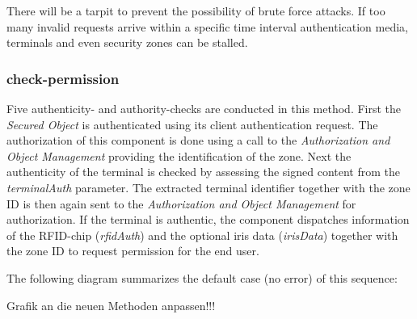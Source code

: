 \documentclass[12pt,a4paper,titlepage,oneside]{scrartcl}
\begin{document}
There will be a tarpit to prevent the possibility of brute force attacks. If too many invalid requests arrive within a specific time interval  authentication media, terminals and even security zones can be stalled.

\subsubsection{check-permission}

Five authenticity- and authority-checks are conducted in this method. First the \emph{Secured Object} is authenticated using its client authentication request. The authorization of this component is done using a call to the \emph{Authorization and Object Management} providing the identification of the zone. Next the authenticity of the terminal is checked by assessing the signed content from the \emph{terminalAuth} parameter. The extracted terminal identifier together with the zone ID is then again sent to the \emph{Authorization and Object Management} for authorization. If the terminal is authentic, the component dispatches information of the RFID-chip (\emph{rfidAuth}) and the optional iris data (\emph{irisData}) together with the zone ID to request permission for the end user.

The following diagram summarizes the default case (no error) of this sequence:

Grafik an die neuen Methoden anpassen!!!

\begin{figure}[h]

    \centering


\end{figure}
\end{document}
